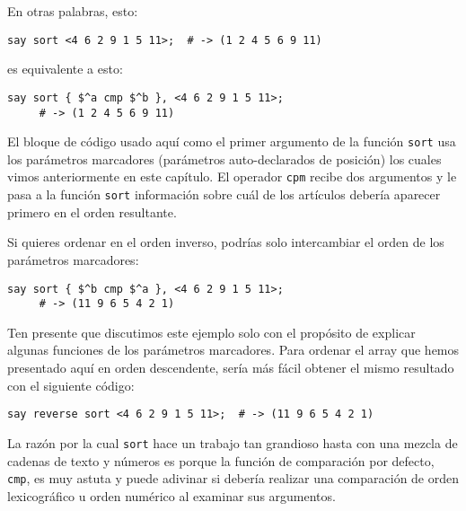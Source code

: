 \ifplastex \else
{}
\fi


En otras palabras, esto:

\begin{verbatim}
say sort <4 6 2 9 1 5 11>;  # -> (1 2 4 5 6 9 11)
\end{verbatim}

es equivalente a esto:

\begin{verbatim}
say sort { $^a cmp $^b }, <4 6 2 9 1 5 11>;
     # -> (1 2 4 5 6 9 11)
\end{verbatim}

El bloque de código usado aquí como el primer argumento
de la función {\tt sort} usa los parámetros marcadores
(parámetros auto-declarados de posición) los cuales
vimos anteriormente en este capítulo. El operador
{\tt cpm} recibe dos argumentos y le pasa a la
función {\tt sort}  información sobre cuál de los 
artículos debería aparecer primero en el orden 
resultante.

Si quieres ordenar en el orden inverso, podrías solo
intercambiar el orden de los parámetros marcadores:

\begin{verbatim}
say sort { $^b cmp $^a }, <4 6 2 9 1 5 11>;
     # -> (11 9 6 5 4 2 1)
\end{verbatim}

Ten presente que discutimos este ejemplo solo con el
propósito de explicar algunas funciones de los 
parámetros marcadores. Para ordenar el array que hemos
presentado aquí en orden descendente, sería más fácil 
obtener el mismo resultado con el siguiente código:

\begin{verbatim}
say reverse sort <4 6 2 9 1 5 11>;  # -> (11 9 6 5 4 2 1)
\end{verbatim}

La razón por la cual {\tt sort} hace un trabajo tan grandioso
hasta con una mezcla de cadenas de texto y números es porque 
la función de comparación por defecto, {\tt cmp}, es muy astuta 
y puede adivinar si debería realizar una comparación de orden
lexicográfico u orden numérico al examinar sus argumentos.

